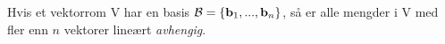 Hvis et vektorrom V har en basis $\mathcal{B} = \{ \mathbf{b}_1, ..., \mathbf{b}_n \}$,
så er alle mengder i V med fler enn $n$ vektorer lineært \emph{avhengig}.
